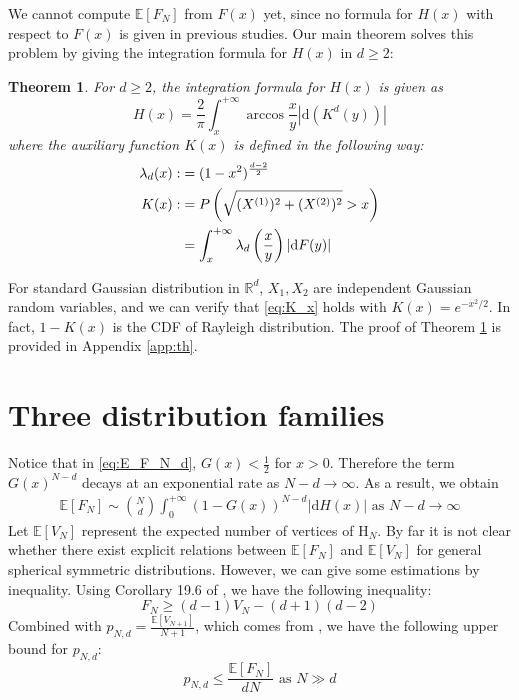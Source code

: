 \documentclass[conference,a4paper]{IEEEtran}
\def\E{\mathbb{E}}
\def\R{\mathbb{R}}
\def\d{\mathrm{d}}
\newtheorem{theorem}{Theorem}
\begin{document}
We cannot compute $\E[F_N]$ from $F(x)$ yet, since no formula for $H(x)$ with respect to $F(x)$ is given in previous studies.
Our main theorem solves this problem by giving the integration formula for $H(x)$ in $d\geq 2$:
\begin{theorem}\label{thm:H}
For $d\geq 2$, the integration formula for $H(x)$ is given as
\begin{equation}
     H(x) = \frac{2}{\pi}
     \int_x^{+\infty} \arccos\frac{x}{y}
     |\mathrm{d} (K^d(y))|\label{eq:H_expression_d_dim}
\end{equation}
where the auxiliary function $K(x)$ is defined in the following way:
\begin{align}
     \lambda_d(x)  :&=(1-x^2)^{\frac{d-2}{2}}
     \label{eq:lambda_r}\\
     K(x) :&=P\left(\sqrt{(X^{(1)})^2+(X^{(2)})^2}>x \right)\notag \\
     &=
     \int_x^{+\infty} 
     \lambda_d \left(\frac{x}{y} \right)|\d F(y)|
     \label{eq:K_x}
\end{align}
\end{theorem}
For standard Gaussian distribution in $\R^d$,
$X_1, X_2$ are independent
Gaussian random variables, and we can verify that \eqref{eq:K_x} holds with $K(x) = e^{-x^2/2}$.
In fact, $1-K(x)$ is the CDF of Rayleigh distribution.
The proof of Theorem \ref{thm:H}
is provided in Appendix \ref{app:th}.
\section{Three distribution families}\label{sec:three_distriutions}
Notice that in \eqref{eq:E_F_N_d}, $G(x)<\frac{1}{2}$ for $x>0$. Therefore the
term $G(x)^{N-d}$ decays at an exponential rate as $N-d\to \infty$.
As a result, we obtain
\begin{align}
     \E[F_N] \sim \binom{N}{d} \int_0^{+\infty} 
      (1-G(x))^{N-d} |\d H(x)| \textrm{ as } N-d\to \infty
     \label{eq:E_F_N_d_sim}
\end{align}
Let $\E[V_N]$ represent the expected number of
vertices of $\mathrm{H}_N$.
By far it is not clear whether there exist explicit relations
between $\E[F_N]$ and $\E[V_N]$
for general spherical symmetric distributions.
However, we can give some estimations by inequality.
Using Corollary 19.6 of \cite{brondsted2012introduction}, we have the following
inequality:
\begin{equation}\label{eq:F_V_upper}
     F_N \geq (d-1) V_N - (d+1)(d-2)
 \end{equation}
Combined with $p_{N,d} = \frac{\E[V_{N+1}]}{N+1}$, which comes from
\cite{efron1965convex}, we have the following upper bound for $p_{N,d}$:
\begin{equation}\label{eq:p_N_d_bound}
    p_{N,d} \leq \frac{\E[F_N]}{d N} \textrm{ as } N \gg d
\end{equation}
\end{document}
